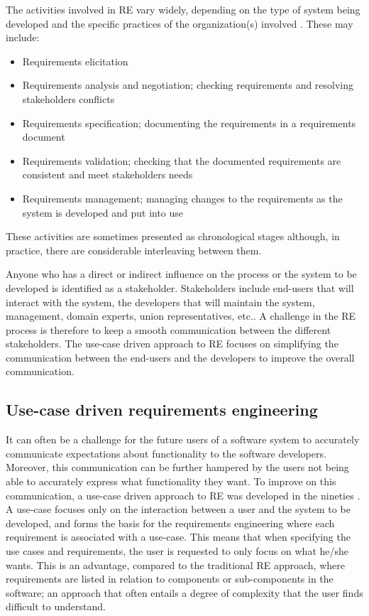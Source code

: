 The activities involved in RE vary widely, depending on the type of system being developed and the specific practices of the organization(s) involved  \cite{Som11}.  These may include:
\begin{itemize}
\item Requirements elicitation 
\item Requirements analysis and negotiation; checking requirements and resolving stakeholders conflicts
\item Requirements specification; documenting the requirements in a requirements document
\item Requirements validation; checking that the documented requirements are consistent and meet stakeholders needs
\item Requirements management; managing changes to the requirements as the system is developed and put into use
\end{itemize}

These activities are sometimes presented as chronological stages although, in practice, there  are considerable interleaving between them.  

Anyone who has a direct or indirect influence on the process or the system to be developed is identified as a stakeholder.   Stakeholders include end-users that will interact with the system, the developers that will maintain the system, management, domain experts, union representatives, etc..  A challenge in the RE process is therefore to keep a smooth communication between the different stakeholders.  The use-case driven approach to RE focuses on simplifying the communication between the end-users and the developers to improve the overall communication.

\subsection{Use-case driven requirements engineering}
\label{sec:use-case-driven}
It can often be a challenge for the future users of a software system to accurately communicate expectations about functionality to the
software developers. Moreover, this communication can be further hampered by the users not
being able to accurately express what functionality they want. To improve on this communication, a use-case driven
approach to RE was developed in the
nineties  \cite{Jac92,Poh10,Coc01}.  A use-case focuses only on the interaction between a user and the system to be
developed, and forms the basis for the requirements engineering where each requirement is
associated with a use-case. This means that when specifying the use cases and requirements, the user is requested to only focus on what he/she wants.  This is an
advantage, compared to the traditional RE approach, where requirements are listed in relation to
components or sub-components in
the software; an approach that often entails a degree of complexity that the user finds difficult to understand.  

